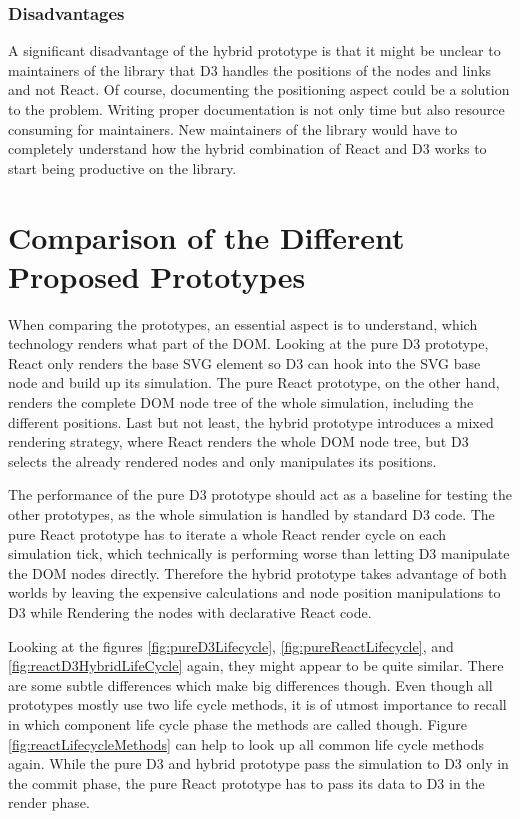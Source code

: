 \subsubsection{Disadvantages}
\label{subsub:hybridDisadvantages}

A significant disadvantage of the hybrid prototype is that it might be unclear to maintainers of the library that D3 handles the positions of the nodes and links and not React. Of course, documenting the positioning aspect could be a solution to the problem. Writing proper documentation is not only time but also resource consuming for maintainers. New maintainers of the library would have to completely understand how the hybrid combination of React and D3 works to start being productive on the library.

\section{Comparison of the Different Proposed Prototypes}

When comparing the prototypes, an essential aspect is to understand, which technology renders what part of the DOM. Looking at the pure D3 prototype, React only renders the base SVG element so D3 can hook into the SVG base node and build up its simulation. The pure React prototype, on the other hand, renders the complete DOM node tree of the whole simulation, including the different positions. Last but not least, the hybrid prototype introduces a mixed rendering strategy, where React renders the whole DOM node tree, but D3 selects the already rendered nodes and only manipulates its positions.

The performance of the pure D3 prototype should act as a baseline for testing the other prototypes, as the whole simulation is handled by standard D3 code. The pure React prototype has to iterate a whole React render cycle on each simulation tick, which technically is performing worse than letting D3 manipulate the DOM nodes directly. Therefore the hybrid prototype takes advantage of both worlds by leaving the expensive calculations and node position manipulations to D3 while Rendering the nodes with declarative React code.

Looking at the figures \ref{fig:pureD3Lifecycle}, \ref{fig:pureReactLifecycle}, and \ref{fig:reactD3HybridLifeCycle} again, they might appear to be quite similar. There are some subtle differences which make big differences though. Even though all prototypes mostly use two life cycle methods, it is of utmost importance to recall in which component life cycle phase the methods are called though. Figure \ref{fig:reactLifecycleMethods} can help to look up all common life cycle methods again. While the pure D3 and hybrid prototype pass the simulation to D3 only in the commit phase, the pure React prototype has to pass its data to D3 in the render phase.

